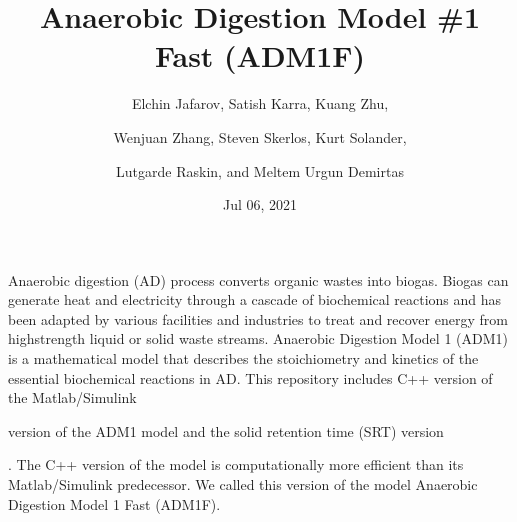\documentclass[a4paper,10pt,english]{sphinxmanual}
\title{Anaerobic Digestion Model \#1 Fast (ADM1F)}
\date{Jul 06, 2021}
\author{Elchin Jafarov, Satish Karra, Kuang Zhu,\and Wenjuan Zhang, Steven Skerlos, Kurt Solander,\and Lutgarde Raskin, and Meltem Urgun Demirtas}
\let\sphinxpxdimen\pdfpxdimen\else\newdimen\sphinxpxdimen
\begin{document}
\pagestyle{empty}
\sphinxmaketitle
\pagestyle{plain}
\sphinxtableofcontents
\pagestyle{normal}
\label{\detokenize{index::doc}}


\sphinxAtStartPar
Anaerobic digestion (AD) process converts organic wastes into biogas. Biogas can generate heat and electricity through a cascade of biochemical reactions and has been adapted by various facilities and industries to treat and recover energy from high\sphinxhyphen{}strength liquid or solid waste streams. Anaerobic Digestion Model 1 (ADM1) is a mathematical model that describes the stoichiometry and kinetics of the essential biochemical reactions in AD. This repository includes C++ version of the Matlab/Simulink %
\begin{footnote}[1]\sphinxAtStartFootnote
{}
%
\end{footnote} version of the ADM1 model and the solid retention time (SRT) version %
\begin{footnote}[2]\sphinxAtStartFootnote
{}
%
\end{footnote}. The C++ version of the model is computationally more efficient than its Matlab/Simulink predecessor. We called this version of the model Anaerobic Digestion Model 1 Fast (ADM1F).

\noindent\sphinxincludegraphics[width=1216\sphinxpxdimen,height=685\sphinxpxdimen]{{digester_m}.png}
\end{document}
